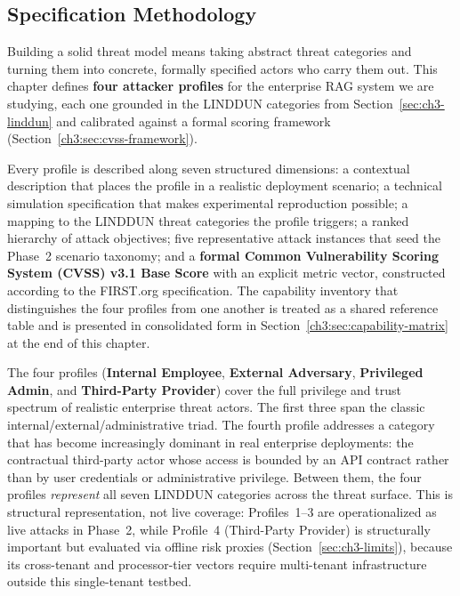 \documentclass[12pt,a4paper]{report}
\begin{document}
\subsection{Specification Methodology}

Building a solid threat model means taking abstract threat categories and
turning them into concrete, formally specified actors who carry them out.
This chapter defines \textbf{four attacker profiles} for the enterprise RAG
system we are studying, each one grounded in the LINDDUN categories from
Section~\ref{sec:ch3-linddun} and calibrated against a formal scoring framework (Section~\ref{ch3:sec:cvss-framework}).

Every profile is described along seven structured dimensions: a contextual
description that places the profile in a realistic deployment scenario; a
technical simulation specification that makes experimental reproduction
possible; a mapping to the LINDDUN threat categories the profile triggers;
a ranked hierarchy of attack objectives; five representative attack
instances that seed the Phase~2 scenario taxonomy; and a \textbf{formal Common Vulnerability Scoring System (CVSS)
v3.1 Base Score} with an explicit metric vector, constructed according
to the FIRST.org specification. The capability inventory that distinguishes
the four profiles from one another is treated as a shared reference table
and is presented in consolidated form in Section~\ref{ch3:sec:capability-matrix}
at the end of this chapter.

The four profiles (\textbf{Internal Employee}, \textbf{External Adversary},
\textbf{Privileged Admin}, and \textbf{Third-Party Provider}) cover the
full privilege and trust spectrum of realistic enterprise threat actors.
The first three span the classic internal/external/administrative triad.
The fourth profile addresses a category that has become increasingly
dominant in real enterprise deployments: the contractual third-party
actor whose access is bounded by an API contract rather than by user
credentials or administrative privilege. Between them, the four profiles
\emph{represent} all seven LINDDUN categories across the threat surface.
This is structural representation, not live coverage: Profiles~1--3 are
operationalized as live attacks in Phase~2, while Profile~4 (Third-Party
Provider) is structurally important but evaluated via offline risk proxies
(Section~\ref{sec:ch3-limits}), because its cross-tenant and processor-tier vectors
require multi-tenant infrastructure outside this single-tenant testbed.
\end{document}
